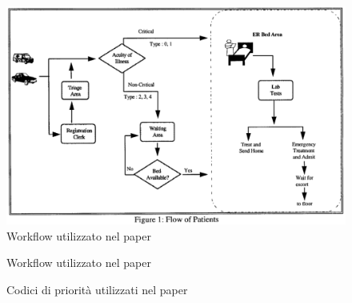 \begin{figure}[!htb]
    \centering
    \includegraphics[width=1\textwidth]{Immagini/garcia-wf.png} 
    \caption{Workflow utilizzato nel paper \textit{\cite{garcia_reducing_1995}}}
\end{figure}

\begin{figure}[!htb]
    \centering
    \caption{Workflow utilizzato nel paper \textit{\cite{stainsby_towards_2009}}}
\end{figure}

\begin{figure}[!htb]
    \centering
    \caption{Codici di priorità utilizzati nel paper \textit{\cite{stainsby_towards_2009}}}
\end{figure}

